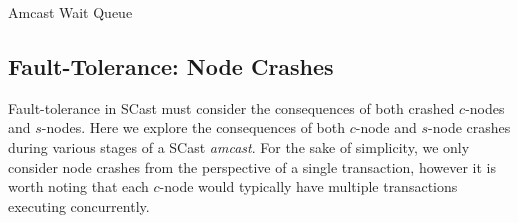     \begin{algorithm}[H]
       \caption{Amcast Wait Queue}
        \label{ps:awq}
        \begin{algorithmic}[1]	        
	            \ENDIF
	            \ENDIF
	        \ENDWHILE
        \end{algorithmic}
    \end{algorithm}   
	\subsection{Fault-Tolerance: Node Crashes}\label{ssec:scast_fault_tolerance}
	Fault-tolerance in \textsf{SCast} must consider the consequences of both crashed $c$-nodes and $s$-nodes.  Here we explore the consequences of both $c$-node and $s$-node crashes during various stages of a \textsf{SCast} \emph{amcast}.  For the sake of simplicity, we only consider node crashes from the perspective of a single transaction, however it is worth noting that each $c$-node would typically have multiple transactions executing concurrently.  
	
